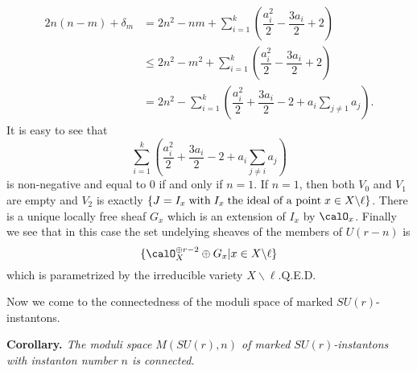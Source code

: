 \begin{itemize}
\begin{equation*}
\begin{split}
2n(n-m)+ \delta_{m} & = 2n^{2}-nm + \sum\limits_{i=1}^{k}\left(\dfrac{a_{i}^{2}}{2}- \dfrac{3a_{i}}{2} + 2\right)\\
& \leq 2n^{2}-m^{2} + \sum\limits_{i=1}^{k}\left(\dfrac{a_{i}^{2}}{2}-\dfrac{3a_{i}}{2} + 2 \right)\\
&= 2n^{2}- \sum\limits_{i=1}^{k}\left(\dfrac{a_{i}^{2}}{2} + \dfrac{3a_{i}}{2}-2 +a_{i}\sum\limits_{j \neq 1}a_{j}\right).
\end{split}
\end{equation*}
It is easy to see that
$$
\sum\limits_{i=1}^{k}\left(\dfrac{a_{i}^{2}}{2} + \dfrac{3a_{i}}{2}-2 +a_{i} \sum\limits_{j \neq i}a_{j}\right)
$$
is non-negative and equal to $0$ if and only if $n=1$. If $n=1$, then both  $V_{0}$ and $V_{1}$ are empty and $V_{2}$ is exactly $\{J=I_{x}\; \text{with}\; I_{x}\;\break \text{the ideal of a point} \;x \in X \backslash \ell \}$. There is a unique locally free sheaf $G_{x}$ which is an extension of $I_{x}$ by $\calO_{x}$. Finally we see that in this case the set undelying sheaves of the members of $U(r-n)$ is
$$
\{\calO_{X}^{\oplus  r-2} \oplus G_{x}| x \in X \backslash \ell\}
$$
which is parametrized by the irreducible variety $X\backslash \ell$.\hfill Q.E.D.

 Now we come to the connectedness of the moduli space of marked $SU(r)$-instantons.
\end{itemize}

\medskip
\noindent
{\bfseries  {} Corollary. \label{art12-coro-3.11}} \textit{The moduli space $M(SU(r), n)$ of marked $SU(r)$-instantons with instanton number $n$ is connected.}


